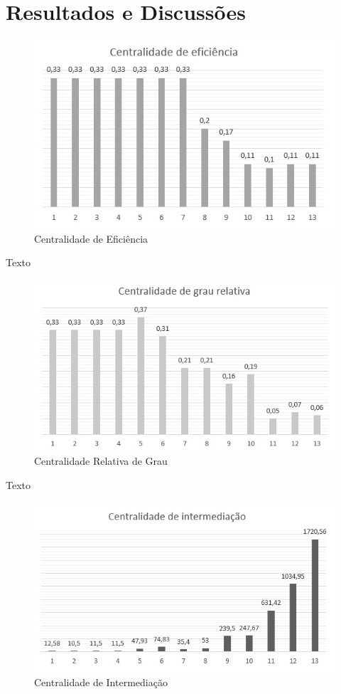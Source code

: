 \documentclass[12pt]{article}
\begin{document}
\section{Resultados e Discussões}\label{sec:result}
\begin{figure}[htp]
	\centering
	\includegraphics[scale=0.75]{Imagens/Eficiencia}
	\caption{Centralidade de Eficiência}
	\label{fig:fig1}
\end{figure}
Texto
\begin{figure}[htp]
	\centering
	\includegraphics[scale=0.75]{Imagens/GrauRelativa}
	\caption{Centralidade Relativa de Grau}
	\label{fig:fig2}
\end{figure}
Texto
\begin{figure}[htp]
	\centering
	\includegraphics[scale=0.75]{Imagens/Intermediacao}
	\caption{Centralidade de Intermediação}
	\label{fig:fig3}
\end{figure}
\end{document}

